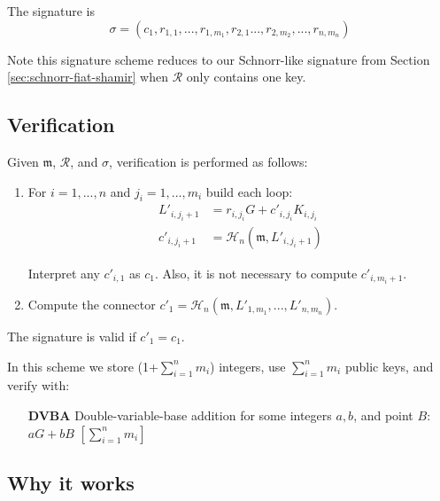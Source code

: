 The signature is
 \[\sigma = (c_1, r_{1, 1}, ..., r_{1, m_1}, r_{2,1} ..., r_{2,m_2}, ..., r_{n, m_n} )  \]

Note this signature scheme reduces to our Schnorr-like signature from Section \ref{sec:schnorr-fiat-shamir} when $\mathcal{R}$ only contains one key.

\subsection*{Verification}

Given \(\mathfrak{m}\), $\mathcal{R}$, and $\sigma$, verification is performed as follows:

\begin{enumerate}
	
	\item For \(i = 1, ..., n \) and \(j_i = 1, ..., m_i \) build each loop:\\
	\begin{align*}
	   L'_{i, j_i+1} &= r_{i, j_i} G + c'_{i, j_i} K_{i, j_i} \\
	   c'_{i, j_i+1} &= \mathcal{H}_n (\mathfrak{m}, L'_{i, j_i+1}) 
	\end{align*}
	
	Interpret any \(c'_{i, 1}\) as \(c_1\). Also, it is not necessary to compute $c'_{i, m_i+1}$.
	
	\item Compute the connector \(c'_1 = \mathcal{H}_n (\mathfrak{m}, L'_{1, m_1}, ..., L'_{n, m_n}) \).
	
\end{enumerate}

The signature is valid if \(c'_1 = c_1\).

In this scheme we store (1+$\sum^n_{i=1} m_i$) integers, use $\sum^n_{i=1} m_i$ public keys, and verify with:

\begin{itemize}
    \setlength\itemsep{\listspace}
    \item [\textbf{DVBA}] Double-variable-base addition for some integers $a, b$, and point $B$: $a G + b B$ \quad \([\sum^n_{i=1} m_i]\)
\end{itemize}


\subsection*{Why it works}


